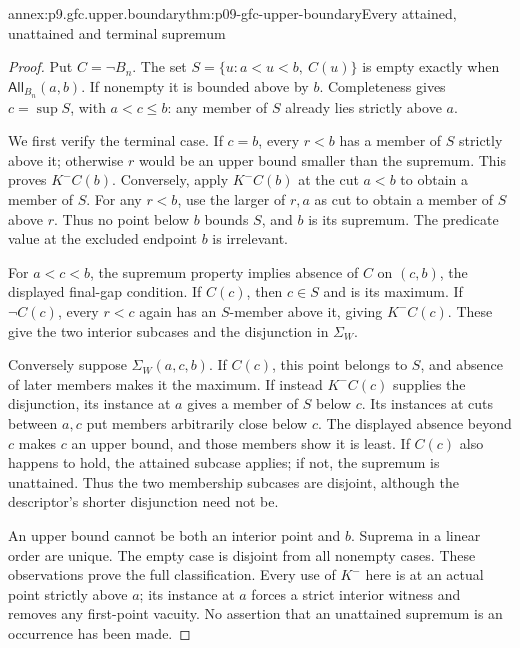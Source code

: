\begin{annexitem}{annex:p9.gfc.upper.boundary}{thm:p09-gfc-upper-boundary}{Every attained, unattained and terminal supremum}
\begin{proof}
Put \(C=\neg B_n\). The set
\(S=\{u:a<u<b,\ C(u)\}\) is empty
exactly when \(\mathsf{All}_{B_n}(a,b)\).
If nonempty it is bounded above by \(b\).
Completeness gives \(c=\sup S\), with
\(a<c\leq b\): any member of \(S\)
already lies strictly above \(a\).

We first verify the terminal case. If
\(c=b\), every \(r<b\) has a member
of \(S\) strictly above it; otherwise
\(r\) would be an upper bound smaller
than the supremum. This proves \(K^-C(b)\).
Conversely, apply \(K^-C(b)\) at the cut
\(a<b\) to obtain a member of \(S\).
For any \(r<b\), use the larger of
\(r,a\) as cut to obtain a member of
\(S\) above \(r\). Thus no point below
\(b\) bounds \(S\), and \(b\) is its
supremum. The predicate value at the
excluded endpoint \(b\) is irrelevant.

For \(a<c<b\), the supremum property
implies absence of \(C\) on \((c,b)\),
the displayed final-gap condition.
If \(C(c)\), then \(c\in S\) and
is its maximum. If \(\neg C(c)\),
every \(r<c\) again has an \(S\)-member
above it, giving \(K^-C(c)\).
These give the two interior subcases
and the disjunction in \(\Sigma_W\).

Conversely suppose \(\Sigma_W(a,c,b)\).
If \(C(c)\), this point belongs to
\(S\), and absence of later members
makes it the maximum. If instead
\(K^-C(c)\) supplies the disjunction,
its instance at \(a\) gives a member
of \(S\) below \(c\). Its instances
at cuts between \(a,c\) put members
arbitrarily close below \(c\).
The displayed absence beyond \(c\)
makes \(c\) an upper bound, and
those members show it is least.
If \(C(c)\) also happens to hold,
the attained subcase applies; if
not, the supremum is unattained.
Thus the two membership subcases
are disjoint, although the
descriptor's shorter disjunction
need not be.

An upper bound cannot be both
an interior point and \(b\).
Suprema in a linear order are
unique. The empty case is
disjoint from all nonempty
cases. These observations prove
the full classification. Every
use of \(K^-\) here is at
an actual point strictly above
\(a\); its instance at \(a\)
forces a strict interior
witness and removes any
first-point vacuity.
No assertion that an unattained
supremum is an occurrence
has been made.
\end{proof}
\end{annexitem}

